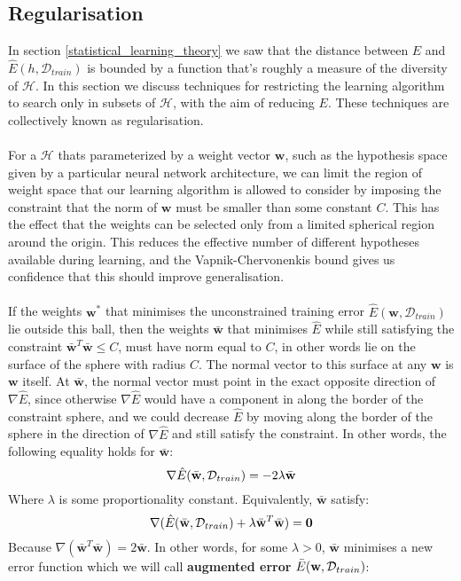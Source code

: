\subsection{Regularisation}
\label{regularisation}
In section \ref{statistical_learning_theory} we saw that the distance between $E$ and $\hat{E}(h, \mathcal{D}_{train})$ is bounded by a function that's roughly a measure of the diversity of $\mathcal{H}$. In this section we discuss techniques for restricting the learning algorithm to search only in subsets of $\mathcal{H}$, with the aim of reducing $E$. These techniques are collectively known as regularisation.
\\\\
For a $\mathcal{H}$ thats parameterized by a weight vector $\mathbf{w}$, such as the hypothesis space given by a particular neural network architecture, we can limit the region of weight space that our learning algorithm is allowed to consider by imposing the constraint that the norm of $\mathbf{w}$ must be smaller than some constant $C$. This has the effect that the weights can be selected only from a limited spherical region around the origin. This reduces the effective number of different hypotheses available during learning, and the Vapnik-Chervonenkis bound gives us confidence that this should improve generalisation.
\\\\
If the weights $\mathbf{w}^*$ that minimises the unconstrained training error $\hat{E}(\mathbf{w}, \mathcal{D}_{train})$ lie outside this ball, then the weights $\bar{\mathbf{w}}$ that minimises $\hat{E}$ while still satisfying the constraint $\bar{\mathbf{w}}^T\bar{\mathbf{w}} \leq C$, must have norm equal to $C$, in other words lie on the surface of the sphere with radius $C$. The normal vector to this surface at any $\mathbf{w}$ is $\mathbf{w}$ itself. At $\bar{\mathbf{w}}$, the normal vector must point in the exact opposite direction of $\nabla \hat{E}$, since otherwise $\nabla \hat{E}$ would have a component in along the border of the constraint sphere, and we could decrease $\hat{E}$ by moving along the border of the sphere in the direction of $\nabla \hat{E}$ and still satisfy the constraint. In other words, the following equality holds for $\bar{\mathbf{w}}$:
$$
\nabla \hat{E}(\bar{\mathbf{w}}, \mathcal{D}_{train}) = -2\lambda\bar{\mathbf{w}}
$$
Where $\lambda$ is some proportionality constant. Equivalently, $\bar{\mathbf{w}}$ satisfy:
$$
\nabla (\hat{E}(\bar{\mathbf{w}}, \mathcal{D}_{train}) + \lambda\bar{\mathbf{w}}^T\bar{\mathbf{w}}) = \mathbf{0}
$$
Because $\nabla(\bar{\mathbf{w}}^T\bar{\mathbf{w}}) = 2\bar{\mathbf{w}}$. In other words, for some $\lambda > 0$, $\bar{\mathbf{w}}$ minimises a new error function which we will call \textbf{augmented error} $\bar{E}(\mathbf{w}, \mathcal{D}_{train})$:
